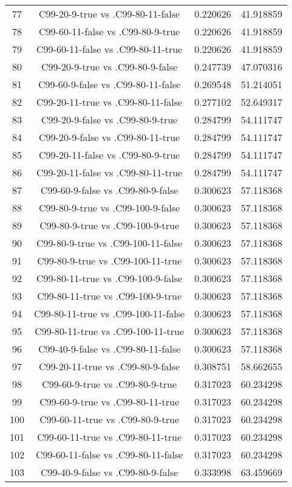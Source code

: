 \documentclass[a4paper,10pt]{article}
\begin{document}
\begin{landscape}
\begin{table}[!htp]
\begin{tabular}{cccc}
77&C99-20-9-true vs .C99-80-11-false&0.220626&41.918859\\
78&C99-60-11-false vs .C99-80-9-true&0.220626&41.918859\\
79&C99-60-11-false vs .C99-80-11-true&0.220626&41.918859\\
80&C99-20-9-true vs .C99-80-9-false&0.247739&47.070316\\
81&C99-60-9-false vs .C99-80-11-false&0.269548&51.214051\\
82&C99-20-11-true vs .C99-80-11-false&0.277102&52.649317\\
83&C99-20-9-false vs .C99-80-9-true&0.284799&54.111747\\
84&C99-20-9-false vs .C99-80-11-true&0.284799&54.111747\\
85&C99-20-11-false vs .C99-80-9-true&0.284799&54.111747\\
86&C99-20-11-false vs .C99-80-11-true&0.284799&54.111747\\
87&C99-60-9-false vs .C99-80-9-false&0.300623&57.118368\\
88&C99-80-9-true vs .C99-100-9-false&0.300623&57.118368\\
89&C99-80-9-true vs .C99-100-9-true&0.300623&57.118368\\
90&C99-80-9-true vs .C99-100-11-false&0.300623&57.118368\\
91&C99-80-9-true vs .C99-100-11-true&0.300623&57.118368\\
92&C99-80-11-true vs .C99-100-9-false&0.300623&57.118368\\
93&C99-80-11-true vs .C99-100-9-true&0.300623&57.118368\\
94&C99-80-11-true vs .C99-100-11-false&0.300623&57.118368\\
95&C99-80-11-true vs .C99-100-11-true&0.300623&57.118368\\
96&C99-40-9-false vs .C99-80-11-false&0.300623&57.118368\\
97&C99-20-11-true vs .C99-80-9-false&0.308751&58.662655\\
98&C99-60-9-true vs .C99-80-9-true&0.317023&60.234298\\
99&C99-60-9-true vs .C99-80-11-true&0.317023&60.234298\\
100&C99-60-11-true vs .C99-80-9-true&0.317023&60.234298\\
101&C99-60-11-true vs .C99-80-11-true&0.317023&60.234298\\
102&C99-60-11-false vs .C99-80-11-false&0.317023&60.234298\\
103&C99-40-9-false vs .C99-80-9-false&0.333998&63.459669\\

\end{tabular}
\end{table}
\end{landscape}
\end{document}
